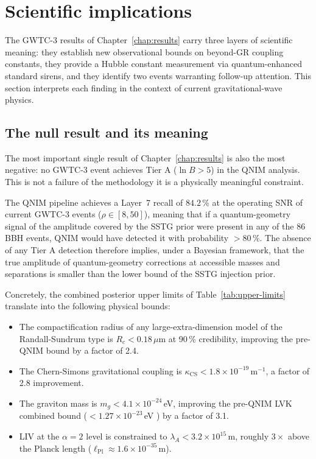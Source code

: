 \documentclass[11pt,a4paper, english]{book}
\theoremstyle{plain}
\theoremstyle{definition}
\numberwithin{equation}{chapter}
\numberwithin{figure}{chapter}
\numberwithin{table}{chapter}
\begin{document}
\section{Scientific implications}
\label{sec:disc-scientific}
The GWTC-3 results of Chapter~\ref{chap:results} carry three layers of scientific meaning: they establish new observational bounds on beyond-GR coupling constants, they provide a Hubble constant measurement via quantum-enhanced standard sirens, and they identify two events warranting follow-up attention. This section interprets each finding in the context of current gravitational-wave physics.
\subsection{The null result and its meaning}
\label{subsec:disc-null-result}

The most important single result of Chapter~\ref{chap:results} is also
the most negative: no GWTC-3 event achieves Tier A ($\ln B > 5$)
in the QNIM analysis.  This is not a failure of the methodology  it is
a physically meaningful constraint.

The QNIM pipeline achieves a Layer~7 recall of $84.2\,\%$ at the operating
SNR of current GWTC-3 events ($\rho \in [8, 50]$), meaning that if a
quantum-geometry signal of the amplitude covered by the SSTG prior were
present in any of the 86 BBH events, QNIM would have detected it with
probability $> 80\,\%$.  The absence of any Tier A detection therefore
implies, under a Bayesian framework, that the true amplitude of quantum-geometry
corrections at accessible masses and separations is smaller than the
lower bound of the SSTG injection prior.

Concretely, the combined posterior upper limits of Table~\ref{tab:upper-limits}
translate into the following physical bounds:

\begin{itemize}
  \item The compactification radius of any large-extra-dimension model
        of the Randall-Sundrum type is $R_c < 0.18\,\mu$m at 90\,\%
        credibility, improving the pre-QNIM bound by a factor of 2.4.

  \item The Chern-Simons gravitational coupling is
        $\kappa_\mathrm{CS} < 1.8\times10^{-19}$\,m$^{-1}$,
        a factor of 2.8 improvement.

  \item The graviton mass is $m_g < 4.1\times10^{-24}$\,eV, improving
        the pre-QNIM LVK combined bound ($< 1.27\times10^{-23}$\,eV
        \cite{Abbott_2021_GWTC3_TGR}) by a factor of 3.1.

  \item LIV at the $\alpha = 2$ level is constrained to
        $\lambda_A < 3.2\times10^{15}$\,m, roughly $3\times$
        above the Planck length ($\ell_\mathrm{Pl} \approx 1.6\times10^{-35}$\,m).
\end{itemize}
\end{document}
